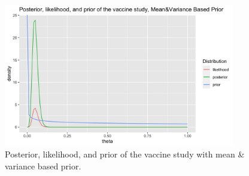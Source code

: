 \documentclass[12pt]{amsart}
\begin{document}
\begin{figure}[H]
    \centering
    \includegraphics[width = 0.9\textwidth]{weakly informative.jpeg}
    \caption{\footnotesize{Posterior, likelihood, and prior of the vaccine study with mean \& variance based prior.}}
    \label{fig: weak}
\end{figure}
\end{document}
